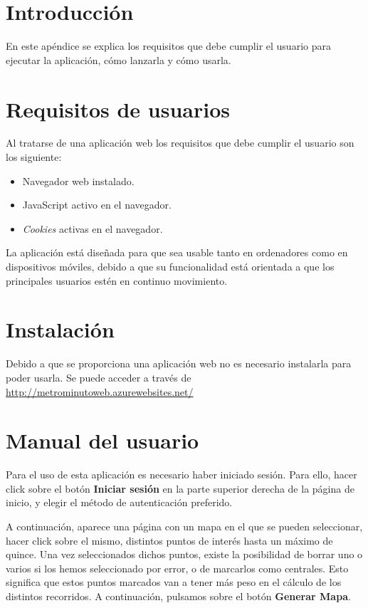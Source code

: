 
\section{Introducción}
En este apéndice se explica los requisitos que debe cumplir el usuario para ejecutar la aplicación, cómo lanzarla y cómo usarla.

\section{Requisitos de usuarios}
Al tratarse de una aplicación web los requisitos que debe cumplir el usuario son los siguiente:
\begin{itemize}
	\item Navegador web instalado.
	\item JavaScript activo en el navegador.
	\item \textit{Cookies} activas en el navegador.
\end{itemize}

La aplicación está diseñada para que sea usable tanto en ordenadores como en dispositivos móviles, debido a que su funcionalidad está orientada a que los principales usuarios estén en continuo movimiento.

\section{Instalación}
Debido a que se proporciona una aplicación web no es necesario instalarla para poder usarla. Se puede acceder a través de \url{http://metrominutoweb.azurewebsites.net/}

\section{Manual del usuario}
Para el uso de esta aplicación es necesario haber iniciado sesión. Para ello, hacer click sobre el botón \textbf{Iniciar sesión} en la parte superior derecha de la página de inicio, y elegir el método de autenticación preferido.


A continuación, aparece una página con un mapa en el que se pueden seleccionar, hacer click sobre el mismo, distintos puntos de interés hasta un máximo de quince. Una vez seleccionados dichos puntos, existe la posibilidad de borrar uno o varios si los hemos seleccionado por error, o de marcarlos como centrales. Esto significa que estos puntos marcados van a tener más peso en el cálculo de los distintos recorridos. A continuación, pulsamos sobre el botón \textbf{Generar Mapa}.


